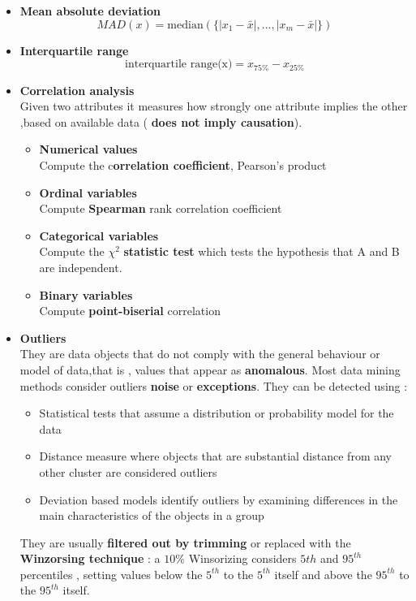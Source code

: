 \begin{itemize}
\item \textbf{Mean absolute deviation}\\
$$ MAD(x) = \text{median}\left( \{  |x_1-\bar{x}|,...,|x_m - \bar{x}|\} \right)$$
\item \textbf{Interquartile range}\\
$$ \text{interquartile range(x)} = x_{75\%} - x_{25\%} $$
\item \textbf{Correlation analysis}\\
Given two attributes it measures how strongly one attribute implies the other ,based on available data ( \textbf{does not imply causation}).
\begin{itemize}
\item \textbf{Numerical values}\\
Compute the c\textbf{orrelation coefficient}, Pearson's product
\item \textbf{Ordinal variables}\\
Compute \textbf{Spearman} rank correlation coefficient
\item \textbf{Categorical variables}\\
Compute the $\chi ^2$ \textbf{statistic test} which tests the hypothesis that A and B are independent.
\item \textbf{Binary variables}\\
Compute \textbf{point-biserial} correlation
\end{itemize}
\item \textbf{Outliers}\\
They are data objects that do not comply with the general behaviour or model of data,that is , values that appear as \textbf{anomalous}. Most data mining methods consider outliers \textbf{noise} or \textbf{exceptions}. They can be detected using : \begin{itemize}
\item Statistical tests that assume a distribution or probability model for the data
\item Distance measure where objects that are substantial distance from any other cluster are considered outliers
\item Deviation based models identify outliers by examining differences in the main characteristics of the objects in a group
\end{itemize}
They are usually \textbf{filtered out by trimming} or replaced with the \textbf{Winzorsing technique} : a $10\%$ Winsorizing considers $5{th}$ and $95^{th}$ percentiles , setting values below the $5^{th}$ to the $5^{th}$ itself and above the $95^{th}$ to the $95^{th}$ itself.  
\end{itemize}

